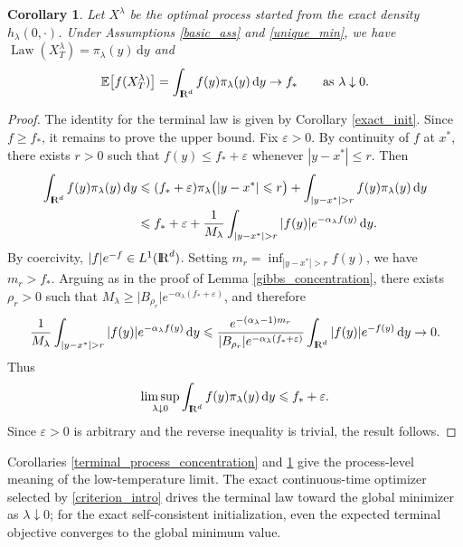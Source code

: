 \documentclass[11pt]{amsart}
\def\R{\mathrm{I\kern-0.21emR}}
\newcommand{\E}{\mathbb{E}}
\newcommand{\dd}{\,\mathrm{d}}
\newcommand{\Law}{\operatorname{Law}}
\renewcommand{\geq}{\geqslant}
\renewcommand{\leq}{\leqslant}
\renewcommand{\Vert}{|}
\numberwithin{equation}{section}
\numberwithin{figure}{section}
\newtheorem{corollary}[theorem]{Corollary}%
\theoremstyle{definition}\newtheorem{remark}[theorem]{Remark}%
\begin{document}
\begin{corollary}\label{objective_exact_init}
Let $X^\lambda$ be the optimal process started from the exact density $h_\lambda(0,\cdot)$. Under Assumptions \ref{basic_ass} and \ref{unique_min}, we have $\Law(X_T^\lambda) = \pi_\lambda(y)\dd y$ and
$$
\E \big[ f(X_T^\lambda) \big] = \int_{\R^d} f(y)\pi_\lambda(y)\dd y \to f_*
\qquad
\text{as } \lambda \downarrow 0.
$$
\end{corollary}

\begin{proof}
The identity for the terminal law is given by Corollary \ref{exact_init}. Since $f \geq f_*$, it remains to prove the upper bound. Fix $\varepsilon > 0$. By continuity of $f$ at $x^*$, there exists $r > 0$ such that
$f(y) \leq f_* + \varepsilon$ whenever $\Vert y - x^* \Vert \leq r$.
Then
\begin{align*}
\int_{\R^d} f(y)\pi_\lambda(y)\dd y
&\leq (f_* + \varepsilon)\pi_\lambda\big( \Vert y - x^* \Vert \leq r \big) + \int_{\Vert y - x^* \Vert > r} f(y)\pi_\lambda(y)\dd y \\
&\leq f_* + \varepsilon + \frac{1}{M_\lambda}\int_{\Vert y - x^* \Vert > r} \vert f(y) \vert e^{-\alpha_\lambda f(y)}\dd y.
\end{align*}
By coercivity, $\vert f \vert e^{-f} \in L^1(\R^d)$. Setting $m_r = \inf_{\Vert y - x^* \Vert > r} f(y)$, we have $m_r > f_*$. Arguing as in the proof of Lemma \ref{gibbs_concentration}, there exists $\rho_r > 0$ such that $M_\lambda \geq \vert B_{\rho_r} \vert e^{-\alpha_\lambda(f_* + \varepsilon)}$, and therefore
$$
\frac{1}{M_\lambda}\int_{\Vert y - x^* \Vert > r} \vert f(y) \vert e^{-\alpha_\lambda f(y)}\dd y
\leq \frac{e^{-(\alpha_\lambda - 1)m_r}}{\vert B_{\rho_r} \vert e^{-\alpha_\lambda(f_* + \varepsilon)}}\int_{\R^d} \vert f(y) \vert e^{-f(y)}\dd y
\to 0.
$$
Thus
$$
\limsup_{\lambda \downarrow 0} \int_{\R^d} f(y)\pi_\lambda(y)\dd y \leq f_* + \varepsilon.
$$
Since $\varepsilon > 0$ is arbitrary and the reverse inequality is trivial, the result follows.
\end{proof}

Corollaries \ref{terminal_process_concentration} and \ref{objective_exact_init} give the process-level meaning of the low-temperature limit. The exact continuous-time optimizer selected by \eqref{criterion_intro} drives the terminal law toward the global minimizer as $\lambda \downarrow 0$; for the exact self-consistent initialization, even the expected terminal objective converges to the global minimum value.
\end{document}
